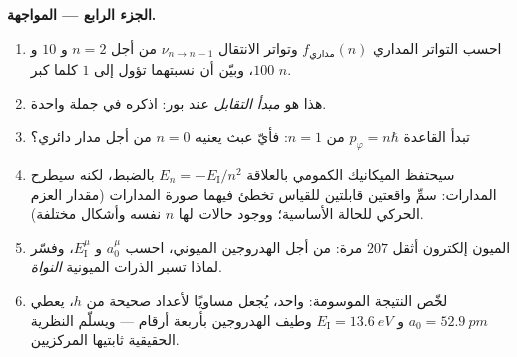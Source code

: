 \begin{problem}
\medskip\noindent\textbf{الجزء الرابع --- المواجهة.}
\begin{enumerate}[resume]
  \item احسب التواتر المداري $f_{\text{مداري}}(n)$ وتواتر
        الانتقال $\nu_{n \to n-1}$ من أجل $n = 2$ و $10$ و
        $100$، وبيّن أن نسبتهما تؤول إلى $1$ كلما كبر $n$.
  \item هذا هو \emph{مبدأ التقابل} عند بور: اذكره في
        جملة واحدة.
  \item تبدأ القاعدة $p_\varphi = n\hbar$ من $n = 1$: فأيّ عبث
        يعنيه $n = 0$ من أجل مدار دائري؟
  \item سيحتفظ الميكانيك الكمومي بالعلاقة $E_n = -E_{\text{I}}/n^2$ بالضبط،
        لكنه سيطرح المدارات: سمِّ واقعتين قابلتين للقياس تخطئ
        فيهما صورة المدارات (مقدار العزم الحركي للحالة
        الأساسية؛ ووجود حالات لها $n$ نفسه وأشكال
        مختلفة).
  \item الميون إلكترون أثقل $207$ مرة: من أجل الهدروجين
        الميوني، احسب $a_0^\mu$ و $E_{\text{I}}^\mu$، وفسّر
        لماذا تسبر الذرات الميونية \emph{النواة}.
  \item لخّص النتيجة الموسومة:  واحد، يُجعل مساويًا
        لأعداد صحيحة من $h$، يعطي $a_0 = \qty{52.9}{pm}$ و
        $E_{\text{I}} = \qty{13.6}{eV}$ وطيف الهدروجين بأربعة
        أرقام --- ويسلّم النظرية الحقيقية ثابتيها المركزيين.
\end{enumerate}
\end{problem}
